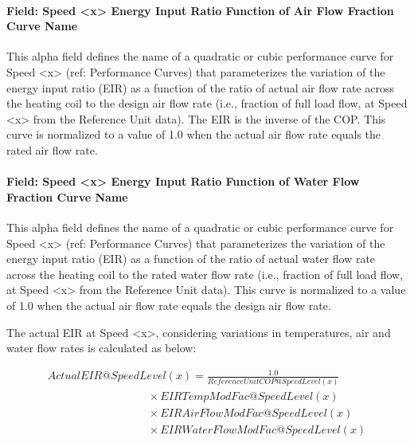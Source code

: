 \paragraph{Field: Speed \textless{}x\textgreater{} Energy Input Ratio Function of Air Flow Fraction Curve Name}\label{field-speed-x-energy-input-ratio-function-of-air-flow-fraction-curve-name-3}

This alpha field defines the name of a quadratic or cubic performance curve for Speed \textless{}x\textgreater{} (ref: Performance Curves) that parameterizes the variation of the energy input ratio (EIR) as a function of the ratio of actual air flow rate across the heating coil to the design air flow rate (i.e., fraction of full load flow, at Speed \textless{}x\textgreater{} from the Reference Unit data). The EIR is the inverse of the COP. This curve is normalized to a value of 1.0 when the actual air flow rate equals the rated air flow rate.

\paragraph{Field: Speed \textless{}x\textgreater{} Energy Input Ratio Function of Water Flow Fraction Curve Name}\label{field-speed-x-energy-input-ratio-function-of-water-flow-fraction-curve-name-1}

This alpha field defines the name of a quadratic or cubic performance curve for Speed \textless{}x\textgreater{} (ref: Performance Curves) that parameterizes the variation of the energy input ratio (EIR) as a function of the ratio of actual water flow rate across the heating coil to the rated water flow rate (i.e., fraction of full load flow, at Speed \textless{}x\textgreater{} from the Reference Unit data). This curve is normalized to a value of 1.0 when the actual air flow rate equals the design air flow rate.

The actual EIR at Speed \textless{}x\textgreater{}, considering variations in temperatures, air and water flow rates is calculated as below:

\begin{equation}
\begin{array}{l}
ActualEIR@SpeedLevel \left( x \right) = \frac{{1.0}}{{ReferenceUnitCOP@SpeedLevel(x)}} \\
\quad \quad \quad \quad \quad \quad \quad \quad \quad \times EIRTempModFac@SpeedLevel(x) \\
\quad \quad \quad \quad \quad \quad \quad \quad \quad \times EIRAirFlowModFac@SpeedLevel(x) \\
\quad \quad \quad \quad \quad \quad \quad \quad \quad \times EIRWaterFlowModFac@SpeedLevel(x)
\end{array}
\end{equation}

